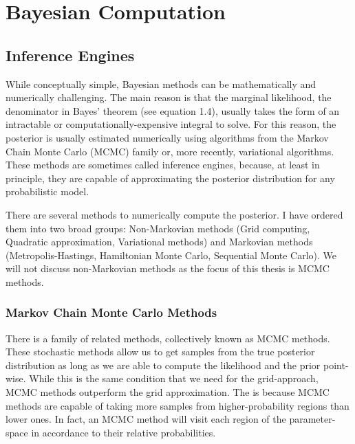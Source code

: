 \chapter*{Bayesian Computation}\label{chap:infeng}


\section{Inference Engines}

While conceptually simple, Bayesian methods can be mathematically and numerically challenging. The main reason is that the marginal likelihood, the denominator in Bayes' theorem (see equation 1.4), usually takes the form of an intractable or computationally-expensive integral to solve. For this reason, the posterior is usually estimated numerically using algorithms from the Markov Chain Monte Carlo (MCMC) family or, more recently, variational algorithms. These methods are sometimes called inference engines, because, at least in principle, they are capable of approximating the posterior distribution for any probabilistic model. 

There are several methods to numerically compute the posterior. I have ordered them into two broad groups: Non-Markovian methods (Grid computing, Quadratic approximation, Variational methods) and Markovian methods (Metropolis-Hastings, Hamiltonian Monte Carlo, Sequential Monte Carlo). We will not discuss non-Markovian methods as the focus of this thesis is MCMC methods.

\subsection{Markov Chain Monte Carlo Methods}



There is a family of related methods, collectively known as MCMC methods. These stochastic methods allow us to get samples from the true posterior distribution as long as we are able to compute the likelihood and the prior point-wise. While this is the same condition that we need for the grid-approach, MCMC methods outperform the grid approximation. The is because MCMC methods are capable of taking more samples from higher-probability regions than lower ones. In fact, an MCMC method will visit each region of the parameter-space in accordance to their relative probabilities.

